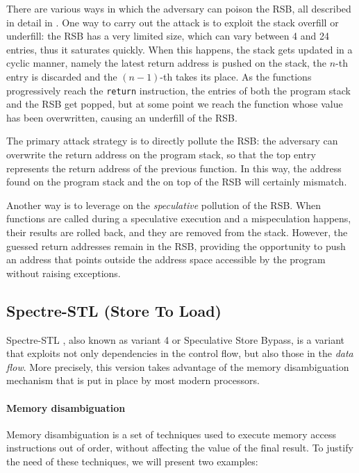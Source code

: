 \documentclass[target=mst,aauheader=aics]{thud}
\theoremstyle{definition}
\begin{document}
	There are various ways in which the adversary can poison the RSB, all described in detail in \cite{Koruyeh2018}. One way to carry out the attack is to exploit the stack overfill or underfill: the RSB has a very limited size, which can vary between 4 and 24 entries, thus it saturates quickly. When this happens, the stack gets updated in a cyclic manner, namely the latest return address is pushed on the stack, the $n$-th entry is discarded and the $(n-1)$-th takes its place. As the functions progressively reach the \texttt{return} instruction, the entries of both the program stack and the RSB get popped, but at some point we reach the function whose value has been overwritten, causing an underfill of the RSB.
	
	The primary attack strategy is to directly pollute the RSB: the adversary can overwrite the return address on the program stack, so that the top entry represents the return address of the previous function. In this way, the address found on the program stack and the on top of the RSB will certainly mismatch. 
	
	Another way is to leverage on the \textit{speculative} pollution of the RSB. When functions are called during a speculative execution and a mispeculation happens, their results are rolled back, and they are removed from the stack. However, the guessed return addresses remain in the RSB, providing the opportunity to push an address that points outside the address space accessible by the program without raising exceptions.
	
	\subsection{Spectre-STL (Store To Load)}\label{sec:spectre-stl}
	Spectre-STL \cite{Canella2019}, also known as variant 4 or Speculative Store Bypass, is a variant that exploits not only dependencies in the control flow, but also those in the \textit{data flow}. More precisely, this version takes advantage of the memory disambiguation mechanism that is put in place by most modern processors.
	
	\paragraph{Memory disambiguation} Memory disambiguation is a set of techniques used to execute memory access instructions out of order, without affecting the value of the final result. To justify the need of these techniques, we will present two examples:
	
\end{document}

